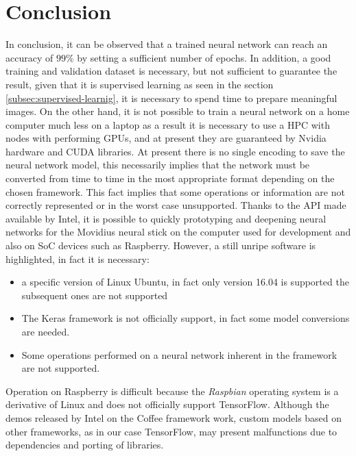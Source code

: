 \section{Conclusion}
\label{sec:conclusion}
In conclusion, it can be observed that a trained neural network can reach an 
accuracy of $99\%$ by setting a sufficient number of epochs. In addition, a 
good training and validation dataset is necessary, but not sufficient to 
guarantee the result, given that it is supervised learning as seen in the 
section \ref{subsec:supervised-learnig}, it is necessary to spend time to 
prepare meaningful images.
On the other hand, it is not possible to train a neural network on a home 
computer much less on a laptop as a result it is necessary to use a HPC with 
nodes with performing GPUs, and at present they are guaranteed by Nvidia 
hardware and CUDA libraries.
At present there is no single encoding to save the neural network model, this 
necessarily implies that the network must be converted from time to time in 
the most appropriate format depending on the chosen framework.
This fact implies that some operations or information are not correctly 
represented or in the worst case unsupported.
Thanks to the API made available by Intel, it is possible to quickly 
prototyping and deepening neural networks for the Movidius neural stick on the 
computer used for development and also on SoC devices such as Raspberry.
However, a still unripe software is highlighted, in fact it is necessary:
\begin{itemize}
\item a specific version of Linux Ubuntu, in fact only version 16.04 is 
supported the subsequent ones are not supported
\item The Keras framework is not officially support, in fact some model 
conversions are needed.
\item Some operations performed on a neural network inherent in the framework 
are not supported.
\end{itemize}
Operation on Raspberry is difficult because the \emph{Raspbian} operating system is a 
derivative of Linux and does not officially support TensorFlow.
Although the demos released by Intel on the Coffee framework work, custom models 
based on other frameworks, as in our case TensorFlow, may present malfunctions due 
to dependencies and porting of libraries.
